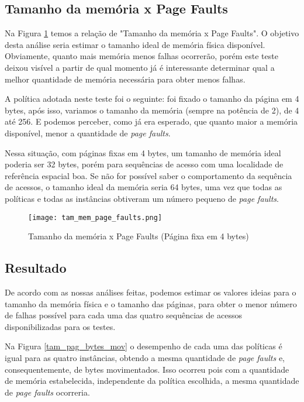 \documentclass[12pt]{article}
\begin{document}
\subsection{Tamanho da memória x Page Faults}
\label{tam_mem_page_faults}


Na Figura \ref{tam_mem_page_faults} temos a relação de "Tamanho da memória x Page Faults". O objetivo desta análise seria estimar o tamanho ideal de memória física disponível. Obviamente, quanto mais memória menos falhas ocorrerão, porém este teste deixou visível a partir de qual momento já é interessante determinar qual a melhor quantidade de memória necessária para obter menos falhas.

A política adotada neste teste foi o seguinte: foi fixado o tamanho da página em 4 bytes, após isso, variamos o tamanho da memória (sempre na potência de 2), de 4 até 256. E podemos perceber, como já era esperado, que quanto maior a memória disponível, menor a quantidade de \textit{page faults}.

Nessa situação, com páginas fixas em 4 bytes, um tamanho de memória ideal poderia ser 32 bytes, porém para sequências de acesso com uma localidade de referência espacial boa. Se não for possível saber o comportamento da sequência de acessos, o tamanho ideal da memória seria 64 bytes, uma vez que todas as políticas e todas as instâncias obtiveram um número pequeno de \textit{page faults}.


   \begin{figure}
        \centering
        \texttt{[image: tam\_mem\_page\_faults.png]}
        \caption{Tamanho da memória x Page Faults (Página fixa em 4 bytes)}
        \label{tam_mem_page_faults}
    \end{figure}


\subsection{Resultado}

De acordo com as nossas análises feitas, podemos estimar os valores ideias para o tamanho da memória física e o tamanho das páginas, para obter o menor número de falhas possível para cada uma das quatro sequências de acessos disponibilizadas para os testes.

Na Figura \ref{tam_pag_bytes_mov} o desempenho de cada uma das políticas é igual para as quatro instâncias, obtendo a mesma quantidade de \textit{page faults} e, consequentemente, de bytes movimentados. Isso ocorreu pois com a quantidade de memória estabelecida, independente da política escolhida, a mesma quantidade de \textit{page faults} ocorreria.
\end{document}
